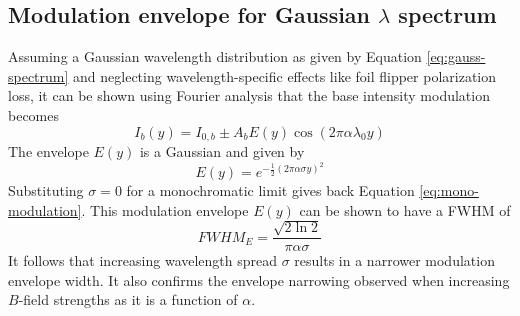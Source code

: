 \subsection{Modulation envelope for Gaussian $\lambda$ spectrum}
Assuming a Gaussian wavelength distribution as given by Equation \eqref{eq:gauss-spectrum} and neglecting wavelength-specific effects like foil flipper polarization loss, it can be shown using Fourier analysis that the base intensity modulation becomes
\begin{equation}
	I_b(y) = I_{0,b} \pm A_bE(y)\cos(2\pi\alpha\lambda_0y) \label{eq:poly-base-modulation}
\end{equation}
The envelope $E(y)$ is a Gaussian and given by
\begin{equation}
	E(y) = e^{-\frac{1}{2}\left(2\pi\alpha\sigma y\right)^2} \label{eq:poly-base-modulation-env}
\end{equation}
Substituting $\sigma=0$ for a monochromatic limit gives back Equation \eqref{eq:mono-modulation}. This modulation envelope $E(y)$ can be shown to have a FWHM of
\begin{equation}
	FWHM_E = \frac{\sqrt{2\ln 2}}{\pi\alpha\sigma} \label{eq:poly-base-modulation-fwhm}
\end{equation}
It follows that increasing wavelength spread $\sigma$ results in a narrower modulation envelope width. It also confirms the envelope narrowing observed when increasing $B$-field strengths \cite{bouwman2021} as it is a function of $\alpha$. 

